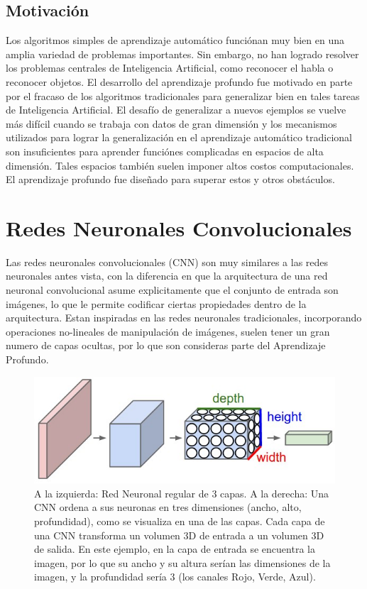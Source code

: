 \documentclass[a4paper,11pt,spanish]{book}
\begin{document}
    \subsection {Motivación}
      Los algoritmos simples de aprendizaje automático funciónan muy bien en una amplia variedad de problemas importantes.
      Sin embargo, no han logrado resolver los problemas centrales de Inteligencia Artificial, como reconocer el habla o reconocer objetos.
      El desarrollo del aprendizaje profundo fue motivado en parte por el fracaso de los algoritmos tradicionales para generalizar bien en tales tareas de Inteligencia Artificial.
      El desafío de generalizar a nuevos ejemplos se vuelve más difícil cuando se trabaja con datos de gran dimensión y los mecanismos utilizados para lograr la generalización
      en el aprendizaje  automático tradicional son insuficientes para aprender funciónes complicadas en espacios de alta dimensión.
      Tales espacios también suelen imponer altos costos computacionales. El aprendizaje profundo fue diseñado para superar estos y otros obstáculos.

  \section {Redes Neuronales Convolucionales}
    Las redes neuronales convolucionales (CNN) son muy similares a las redes neuronales antes vista, con la diferencia en que la arquitectura de una red neuronal convolucional asume explicitamente
    que el conjunto de entrada son imágenes, lo que le permite codificar ciertas propiedades dentro de la arquitectura.
    Estan inspiradas en las redes neuronales tradicionales, incorporando operaciones no-lineales de manipulación de imágenes, suelen tener un gran numero de capas ocultas, por lo que
    son consideras parte del Aprendizaje Profundo.
    \begin{figure}[H]
      \includegraphics[scale=0.5]{./img/stanford_cnn.jpeg}
      \caption{A la izquierda: Red Neuronal regular de 3 capas. A la derecha: Una CNN ordena a sus neuronas en tres dimensiones (ancho, alto, profundidad), como se visualiza en una de
	las capas. Cada capa de una CNN transforma un volumen 3D de entrada a un volumen 3D de salida. En este ejemplo, en la capa de entrada se encuentra la imagen, por lo que su ancho y su altura
	serían las dimensiones de la imagen, y la profundidad sería 3 (los canales Rojo, Verde, Azul).}
      \label{fig:cnn}
    \end{figure}
\end{document}
